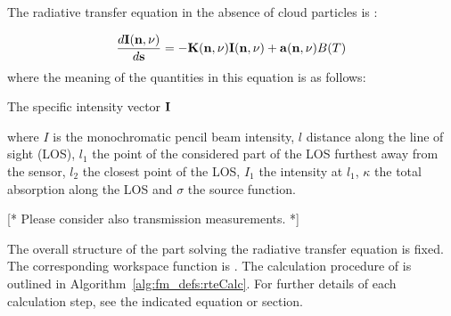 %
%
%
%


The radiative transfer equation in the absence of cloud particles is
\citep{mishchenko00:_light_scatt_nonsp_partic}: 

\begin{equation}
  \label{eq:rte_4stokes_no_scat}
  \frac{d{\bf I}({\bf n},\nu)}{d{\bf s}} = - {\bf K}({\bf n},\nu) {\bf I}({\bf n},\nu) + {\bf a}({\bf n},\nu)B(T)
\end{equation}
where the meaning of the quantities in this equation is as follows:

The specific intensity vector ${\bf I}$



 where $I$ is the monochromatic pencil beam intensity, $l$ distance
 along the line of sight (LOS), $l_1$ the point of the considered part
 of the LOS furthest away from the sensor, $l_2$ the closest point of
 the LOS, $I_1$ the intensity at $l_1$, $\kappa$ the total absorption
 along the LOS and $\sigma$ the source function.

[* Please consider also transmission measurements. *]


\label{sec:fm_defs:calcproc}

The overall structure of the part solving the radiative transfer
equation is fixed. The corresponding workspace function is
. The calculation procedure of  is
outlined in Algorithm~\ref{alg:fm_defs:rteCalc}. For further details
of each calculation step, see the indicated equation or section.

